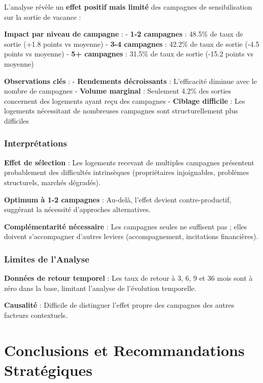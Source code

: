 \documentclass[11pt]{article}
\begin{document}
L'analyse révèle un \textbf{effet positif mais limité} des campagnes de
sensibilisation sur la sortie de vacance :

\textbf{Impact par niveau de campagne} : - \textbf{1-2 campagnes} :
48.5\% de taux de sortie (+1.8 points vs moyenne) - \textbf{3-4
campagnes} : 42.2\% de taux de sortie (-4.5 points vs moyenne) -
\textbf{5+ campagnes} : 31.5\% de taux de sortie (-15.2 points vs
moyenne)

\textbf{Observations clés} : - \textbf{Rendements décroissants} :
L'efficacité diminue avec le nombre de campagnes - \textbf{Volume
marginal} : Seulement 4.2\% des sorties concernent des logements ayant
reçu des campagnes - \textbf{Ciblage difficile} : Les logements
nécessitant de nombreuses campagnes sont structurellement plus
difficiles

\subsubsection{Interprétations}\label{interpruxe9tations}

\textbf{Effet de sélection} : Les logements recevant de multiples
campagnes présentent probablement des difficultés intrinsèques
(propriétaires injoignables, problèmes structurels, marchés dégradés).

\textbf{Optimum à 1-2 campagnes} : Au-delà, l'effet devient
contre-productif, suggérant la nécessité d'approches alternatives.

\textbf{Complémentarité nécessaire} : Les campagnes seules ne suffisent
pas ; elles doivent s'accompagner d'autres leviers (accompagnement,
incitations financières).

\subsubsection{Limites de l'Analyse}\label{limites-de-lanalyse}

\textbf{Données de retour temporel} : Les taux de retour à 3, 6, 9 et 36
mois sont à zéro dans la base, limitant l'analyse de l'évolution
temporelle.

\textbf{Causalité} : Difficile de distinguer l'effet propre des
campagnes des autres facteurs contextuels.

    \section{Conclusions et Recommandations
Stratégiques}\label{conclusions-et-recommandations-stratuxe9giques}
\end{document}
